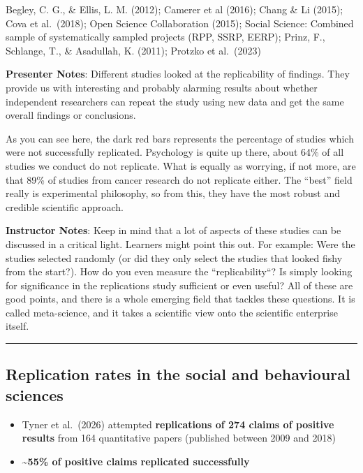 \documentclass[
  english,
  letterpaper,
  DIV=11,
  numbers=noendperiod]{scrartcl}
\providecommand{\tightlist}{%
  \setlength{\itemsep}{0pt}\setlength{\parskip}{0pt}}
\begin{document}
Begley, C. G., \& Ellis, L. M. (2012); Camerer et al (2016); Chang \& Li
(2015); Cova et al.~(2018); Open Science Collaboration (2015); Social
Science: Combined sample of systematically sampled projects (RPP, SSRP,
EERP); Prinz, F., Schlange, T., \& Asadullah, K. (2011); Protzko et
al.~(2023)

\textbf{Presenter Notes}: Different studies looked at the replicability
of findings. They provide us with interesting and probably alarming
results about whether independent researchers can repeat the study using
new data and get the same overall findings or conclusions.

As you can see here, the dark red bars represents the percentage of
studies which were not successfully replicated. Psychology is quite up
there, about 64\% of all studies we conduct do not replicate. What is
equally as worrying, if not more, are that 89\% of studies from cancer
research do not replicate either. The ``best'' field really is
experimental philosophy, so from this, they have the most robust and
credible scientific approach.

\textbf{Instructor Notes}: Keep in mind that a lot of aspects of these
studies can be discussed in a critical light. Learners might point this
out. For example: Were the studies selected randomly (or did they only
select the studies that looked fishy from the start?). How do you even
measure the ``replicability``? Is simply looking for significance in the
replications study sufficient or even useful? All of these are good
points, and there is a whole emerging field that tackles these
questions. It is called meta-science, and it takes a scientific view
onto the scientific enterprise itself.

\begin{center}\rule{0.5\linewidth}{0.5pt}\end{center}

\subsection{Replication rates in the social and behavioural
sciences}\label{replication-rates-in-the-social-and-behavioural-sciences}

\begin{itemize}
\tightlist
\item
  Tyner et al.~(2026) attempted \textbf{replications of 274 claims of
  positive results} from 164 quantitative papers (published between 2009
  and 2018)
\item
  \textbf{\textasciitilde55\% of positive claims replicated
  successfully}
\end{itemize}
\end{document}
